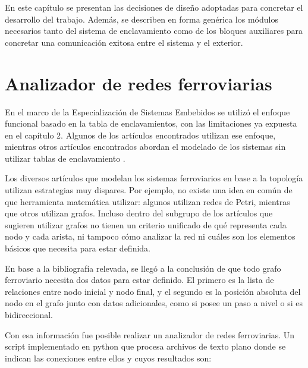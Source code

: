 En este capítulo se presentan las decisiones de diseño adoptadas para concretar el desarrollo del trabajo. Además, se describen en forma genérica los módulos necesarios tanto del sistema de enclavamiento como de los bloques auxiliares para concretar una comunicación exitosa entre el sistema y el exterior.

\section{Analizador de redes ferroviarias}

	En el marco de la Especialización de Sistemas Embebidos se utilizó el enfoque funcional basado en la tabla de enclavamientos, con las limitaciones ya expuesta en el capítulo 2. Algunos de los artículos encontrados utilizan ese enfoque\cite{Fun_1,Fun_2,Fun_3,Fun_4}, mientras otros artículos encontrados abordan el modelado de los sistemas sin utilizar tablas de enclavamiento \cite{Geo_1,Geo_2,Geo_3,Geo_4}.
	
	Los diversos artículos que modelan los sistemas ferroviarios en base a la topología utilizan estrategias muy dispares. Por ejemplo, no existe una idea en común de que herramienta matemática utilizar: algunos utilizan redes de Petri, mientras que otros utilizan grafos. Incluso dentro del subgrupo de los artículos que sugieren utilizar grafos no tienen un criterio unificado de qué representa cada nodo y cada arista, ni tampoco cómo analizar la red ni cuáles son los elementos básicos que necesita para estar definida.	
	
	En base a la bibliografía relevada, se llegó a la conclusión de que todo grafo ferroviario necesita dos datos para estar definido. El primero es la lista de relaciones entre nodo inicial y nodo final, y el segundo es la posición absoluta del nodo en el grafo junto con datos adicionales, como si posee un paso a nivel o si es bidireccional. 
	
	Con esa información fue posible realizar un analizador de redes ferroviarias. Un script implementado en python que procesa archivos de texto plano donde se indican las conexiones entre ellos y cuyos resultados son:
	
